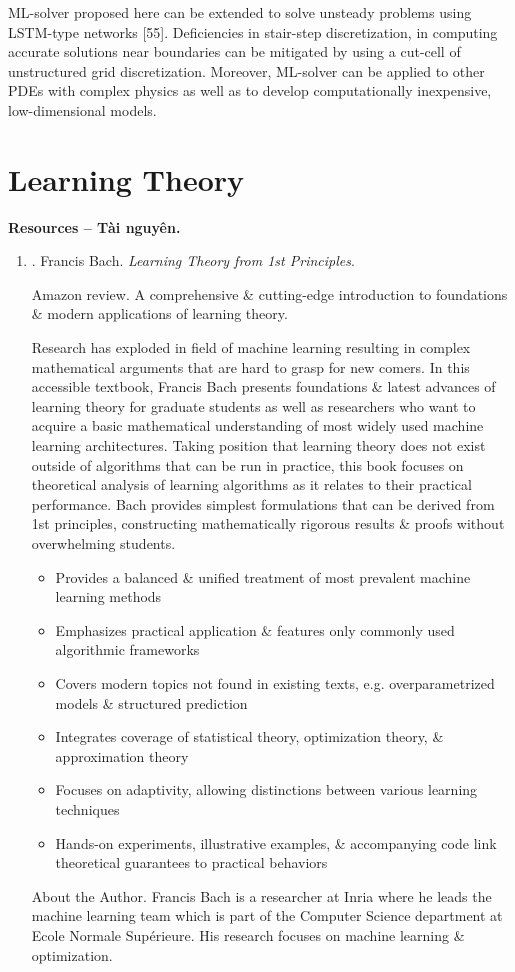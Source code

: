 \documentclass{article}
\begin{document}
\begin{itemize}
	ML-solver proposed here can be extended to solve unsteady problems using LSTM-type networks [55]. Deficiencies in stair-step discretization, in computing accurate solutions near boundaries can be mitigated by using a cut-cell of unstructured grid discretization. Moreover, ML-solver can be applied to other PDEs with complex physics as well as to develop computationally inexpensive, low-dimensional models.
\end{itemize}


\section{Learning Theory}
\textbf{\textsf{Resources -- Tài nguyên.}}
\begin{enumerate}
	\item \cite{Bach2024}. {\sc Francis Bach}. {\it Learning Theory from 1st Principles}.
	
	{\sf Amazon review.} A comprehensive \& cutting-edge introduction to foundations \& modern applications of learning theory.
	
	Research has exploded in field of machine learning resulting in complex mathematical arguments that are hard to grasp for new comers. In this accessible textbook, {\sc Francis Bach} presents foundations \& latest advances of learning theory for graduate students as well as researchers who want to acquire a basic mathematical understanding of most widely used machine learning architectures. Taking position that learning theory does not exist outside of algorithms that can be run in practice, this book focuses on theoretical analysis of learning algorithms as it relates to their practical performance. {\sc Bach} provides simplest formulations that can be derived from 1st principles, constructing mathematically rigorous results \& proofs without overwhelming students.
	\begin{itemize}
		\item Provides a balanced \& unified treatment of most prevalent machine learning methods
		\item Emphasizes practical application \& features only commonly used algorithmic frameworks
		\item Covers modern topics not found in existing texts, e.g. overparametrized models \& structured prediction
		\item Integrates coverage of statistical theory, optimization theory, \& approximation theory
		\item Focuses on adaptivity, allowing distinctions between various learning techniques
		\item Hands-on experiments, illustrative examples, \& accompanying code link theoretical guarantees to practical behaviors
	\end{itemize}
	{\sf About the Author.} {\sc Francis Bach} is a researcher at Inria where he leads the machine learning team which is part of the Computer Science department at Ecole Normale Supérieure. His research focuses on machine learning \& optimization.
	

\end{enumerate}
\end{document}
